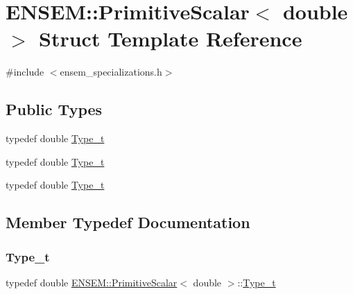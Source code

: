 \hypertarget{structENSEM_1_1PrimitiveScalar_3_01double_01_4}{}\section{E\+N\+S\+EM\+:\+:Primitive\+Scalar$<$ double $>$ Struct Template Reference}
\label{structENSEM_1_1PrimitiveScalar_3_01double_01_4}


{\ttfamily \#include $<$ensem\+\_\+specializations.\+h$>$}

\subsection*{Public Types}
\begin{DoxyCompactItemize}
\item 
typedef double \mbox{\hyperlink{structENSEM_1_1PrimitiveScalar_3_01double_01_4_aa2e1f2e6e01268fb7f088e4f05c58a7f}{Type\+\_\+t}}
\item 
typedef double \mbox{\hyperlink{structENSEM_1_1PrimitiveScalar_3_01double_01_4_aa2e1f2e6e01268fb7f088e4f05c58a7f}{Type\+\_\+t}}
\item 
typedef double \mbox{\hyperlink{structENSEM_1_1PrimitiveScalar_3_01double_01_4_aa2e1f2e6e01268fb7f088e4f05c58a7f}{Type\+\_\+t}}
\end{DoxyCompactItemize}


\subsection{Member Typedef Documentation}
\mbox{\label{structENSEM_1_1PrimitiveScalar_3_01double_01_4_aa2e1f2e6e01268fb7f088e4f05c58a7f}} 
\subsubsection{\texorpdfstring{Type\_t}{Type\_t}\hspace{0.1cm}{\footnotesize\ttfamily [1/3]}}
{\footnotesize\ttfamily typedef double \mbox{\hyperlink{structENSEM_1_1PrimitiveScalar}{E\+N\+S\+E\+M\+::\+Primitive\+Scalar}}$<$ double $>$\+::\mbox{\hyperlink{structENSEM_1_1PrimitiveScalar_3_01double_01_4_aa2e1f2e6e01268fb7f088e4f05c58a7f}{Type\+\_\+t}}}

